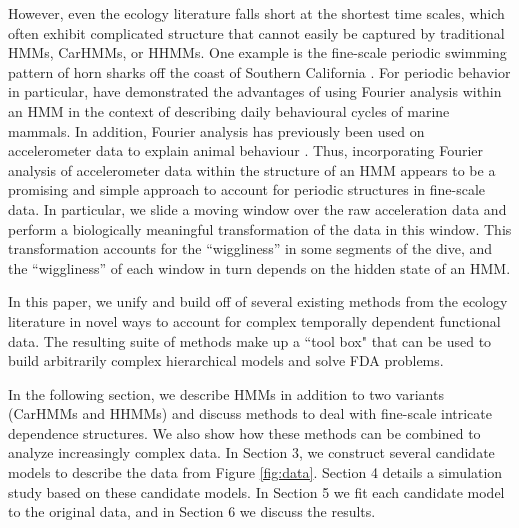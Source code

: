 However, even the ecology literature falls short at the shortest time scales, which often exhibit complicated structure that cannot easily be captured by traditional HMMs, CarHMMs, or HHMMs. One example is the fine-scale periodic swimming pattern of horn sharks off the coast of Southern California \citep{Adam:2019}. For periodic behavior in particular, \cite{Heerah:2017} have demonstrated the advantages of using Fourier analysis within an HMM in the context of describing daily behavioural cycles of marine mammals. In addition, Fourier analysis has previously been used on accelerometer data to explain animal behaviour \citep{Fehlmann:2017,Shorter:2017}. Thus, incorporating Fourier analysis of accelerometer data within the structure of an HMM appears to be a promising and simple approach to account for periodic structures in fine-scale data. In particular, we slide a moving window over the raw acceleration data and perform a biologically meaningful transformation of the data in this window. This transformation accounts for the ``wiggliness'' in some segments of the dive, and the ``wiggliness'' of each window in turn depends on the hidden state of an HMM.

In this paper, we unify and build off of several existing methods from the ecology literature in novel ways to account for complex temporally dependent functional data. The resulting suite of methods make up a ``tool box" that can be used to build arbitrarily complex hierarchical models and solve FDA problems.

In the following section, we describe HMMs in addition to two variants (CarHMMs and HHMMs) and discuss methods to deal with fine-scale intricate dependence structures. We also show how these methods can be combined to analyze increasingly complex data. In Section 3, we construct several candidate models to describe the data from Figure \ref{fig:data}. Section 4 details a simulation study based on these candidate models. In Section 5 we fit each candidate model to the original data, and in Section 6 we discuss the results.
